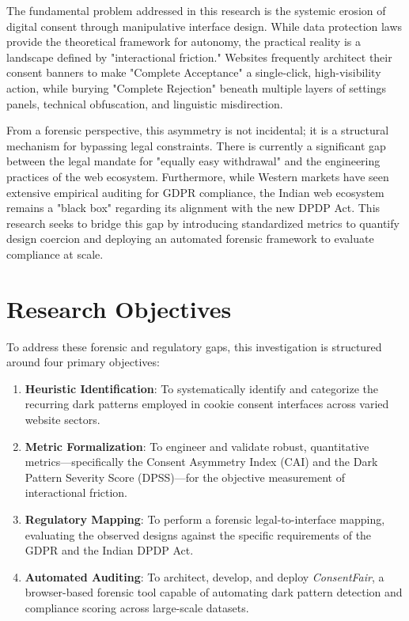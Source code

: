 \documentclass[12pt,a4paper]{report}
\begin{document}
The fundamental problem addressed in this research is the systemic erosion of digital consent through manipulative interface design. While data protection laws provide the theoretical framework for autonomy, the practical reality is a landscape defined by "interactional friction." Websites frequently architect their consent banners to make "Complete Acceptance" a single-click, high-visibility action, while burying "Complete Rejection" beneath multiple layers of settings panels, technical obfuscation, and linguistic misdirection.

From a forensic perspective, this asymmetry is not incidental; it is a structural mechanism for bypassing legal constraints. There is currently a significant gap between the legal mandate for "equally easy withdrawal" and the engineering practices of the web ecosystem. Furthermore, while Western markets have seen extensive empirical auditing for GDPR compliance, the Indian web ecosystem remains a "black box" regarding its alignment with the new DPDP Act. This research seeks to bridge this gap by introducing standardized metrics to quantify design coercion and deploying an automated forensic framework to evaluate compliance at scale.

\section{Research Objectives}

To address these forensic and regulatory gaps, this investigation is structured around four primary objectives:

\begin{enumerate}[leftmargin=1.5cm]
\item \textbf{Heuristic Identification}: To systematically identify and categorize the recurring dark patterns employed in cookie consent interfaces across varied website sectors.
\item \textbf{Metric Formalization}: To engineer and validate robust, quantitative metrics—specifically the Consent Asymmetry Index (CAI) and the Dark Pattern Severity Score (DPSS)—for the objective measurement of interactional friction.
\item \textbf{Regulatory Mapping}: To perform a forensic legal-to-interface mapping, evaluating the observed designs against the specific requirements of the GDPR and the Indian DPDP Act.
\item \textbf{Automated Auditing}: To architect, develop, and deploy \textit{ConsentFair}, a browser-based forensic tool capable of automating dark pattern detection and compliance scoring across large-scale datasets.
\end{enumerate}
\end{document}
